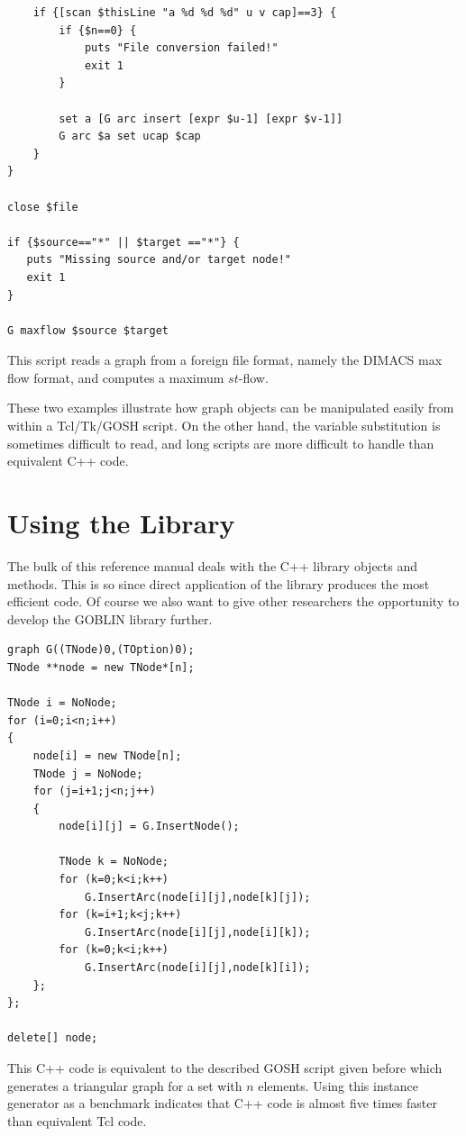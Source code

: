 \documentclass[a4paper,11pt,twoside]{book}
\begin{document}
\begin{multicols}{2}
\begin{mysample}
\begin{verbatim}
    if {[scan $thisLine "a %d %d %d" u v cap]==3} {
        if {$n==0} {
            puts "File conversion failed!"
            exit 1
        }

        set a [G arc insert [expr $u-1] [expr $v-1]]
        G arc $a set ucap $cap
    }
}

close $file

if {$source=="*" || $target =="*"} {
   puts "Missing source and/or target node!"
   exit 1
}

G maxflow $source $target
\end{verbatim}
\end{mysample}
This script reads a graph from a foreign file format, namely the DIMACS max
flow format, and computes a maximum $st$-flow.

These two examples illustrate how graph objects can be manipulated easily from
within a Tcl/Tk/GOSH script. On the other hand, the variable substitution is
sometimes difficult to read, and long scripts are more difficult to handle
than equivalent C++ code. 



\section{Using the Library}

The bulk of this reference manual deals with the C++ library objects and
methods. This is so since direct application of the library produces the most
efficient code. Of course we also want to give other researchers the
opportunity to develop the GOBLIN library further.
\begin{mysample}
\begin{verbatim}
graph G((TNode)0,(TOption)0);
TNode **node = new TNode*[n];

TNode i = NoNode;
for (i=0;i<n;i++)
{
    node[i] = new TNode[n];
    TNode j = NoNode;
    for (j=i+1;j<n;j++)
    {
        node[i][j] = G.InsertNode();

        TNode k = NoNode;
        for (k=0;k<i;k++)
            G.InsertArc(node[i][j],node[k][j]);
        for (k=i+1;k<j;k++)
            G.InsertArc(node[i][j],node[i][k]);
        for (k=0;k<i;k++)
            G.InsertArc(node[i][j],node[k][i]);
    };
};

delete[] node;
\end{verbatim}
\end{mysample}
This C++ code is equivalent to the described GOSH script given before which
generates a triangular graph for a set with $n$ elements. Using this instance
generator as a benchmark indicates that C++ code is almost five times faster
than equivalent Tcl code.




\end{multicols}
\end{document}
